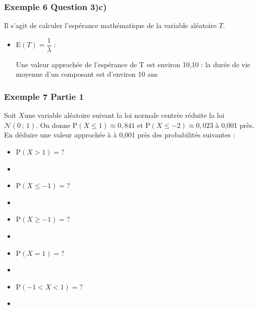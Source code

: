 \documentclass[xcolor=svgnames,t,final]{beamer}
\begin{document}
\begin{frame}


\frametitle{Exemple 6 Question 3)c)}

Il s'agit de calculer l'espérance mathématique de la variable aléatoire $T$.


\begin{itemize}

	\pause		\item	
E$(T)=\dfrac{1}{\lambda}$ :


Une valeur approchée de l'espérance de T est environ 10,10 :	
la durée de vie moyenne d'un composant est d'environ 10 ans


\end{itemize}


\end{frame}



\begin{frame}
\frametitle{Exemple 7 Partie 1}
\label{exemple7}

Soit  $X $une variable aléatoire suivant la loi normale centrée réduite la loi $\mathcal{N}\left(0 \, ; \, 1\right)$. On donne $\text{P}\left( X \leqslant 1 \right) \approx 0,841$  et  $\text{P}\left( X \leqslant -2 \right) \approx 0,023$ à 0,001 près. En déduire une valeur approchée à à 0,001 près des probabilités suivantes :

\begin{itemize}
\item $\text{P}\left( X > 1 \right) = ?$
\pause \item 
\item $\text{P}\left( X \leqslant -1 \right)=?$
\pause \item
\item $\text{P}\left( X \geqslant -1 \right)=?$
\pause \item
\item $\text{P}\left( X = 1 \right)=?$
\pause \item
\item $\text{P}\left( -1<X<1 \right)=?$
\pause \item

\end{itemize}


\end{frame}
\end{document}

